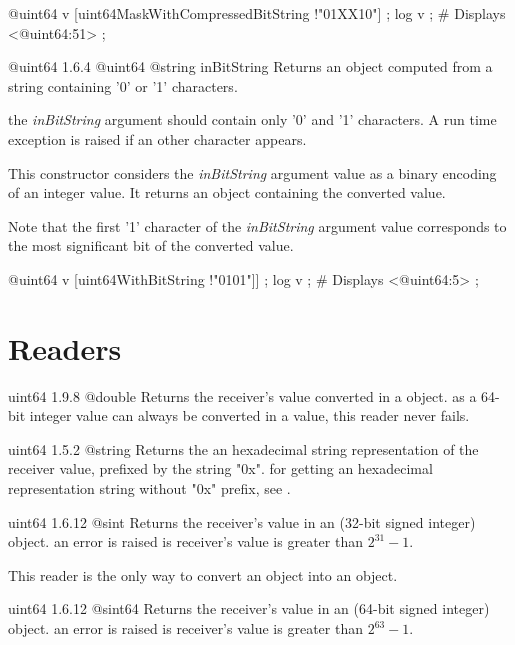 \exempleDeuxLignes
{}
{@uint64 v [uint64MaskWithCompressedBitString !"01XX10"] ;}
{log v ; \# Displays <@uint64:51> ;}



{@uint64}
{1.6.4}
{@uint64}
{@string inBitString}
{Returns an  object computed from a string containing '0' or '1' characters.}
{the \emph{inBitString} argument should contain only '0' and '1' characters. A run time exception is raised if an other character appears.

This constructor considers the \emph{inBitString} argument value as a binary encoding of an integer value. It returns an  object containing the converted value.

Note that the first '1' character of the \emph{inBitString} argument value corresponds to the most significant bit of the converted value.}

\exempleDeuxLignes
{}
{@uint64 v [uint64WithBitString !"0101"]] ;}
{log v ; \# Displays <@uint64:5> ;}


\section{Readers}

{uint64}
{1.9.8}
{@double}
{Returns the receiver's value converted in a  object.}
{as a 64-bit integer value can always be converted in a  value, this reader never fails.}



{uint64}
{1.5.2}
{@string}
{Returns the an hexadecimal string representation of the receiver value, prefixed by the string "0x".}
{for getting an hexadecimal representation string without "0x" prefix, see .}





{uint64}
{1.6.12}
{@sint}
{Returns the receiver's value in an  (32-bit signed integer) object.}
{an error is raised is receiver's value is greater than $2^{31}-1$.}

This reader is the only way to convert an  object into an  object.




{uint64}
{1.6.12}
{@sint64}
{Returns the receiver's value in an  (64-bit signed integer) object.}
{an error is raised is receiver's value is greater than $2^{63}-1$.}


